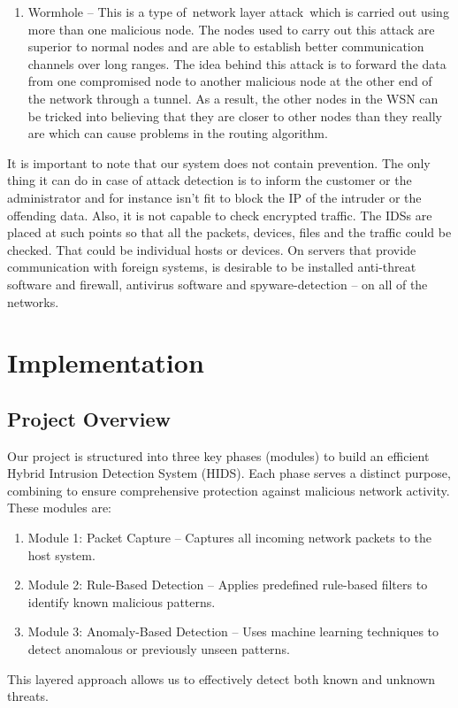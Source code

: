 \documentclass[oneside, english]{reports/assets/sdqtechreport}
\begin{document}
\begin{enumerate}
\begin{enumerate}
	\end{enumerate}
    \item Wormhole – This is a type of network layer attack which is carried out using more than one malicious node. The nodes used to carry out this attack are superior to normal nodes and are able to establish better communication channels over long ranges. The idea behind this attack is to forward the data from one compromised node to another malicious node at the other end of the network through a tunnel. As a result, the other nodes in the WSN can be tricked into believing that they are closer to other nodes than they really are which can cause problems in the routing algorithm.
\end{enumerate}
It is important to note that our system does not contain prevention. The only thing it can do in case of attack detection is to inform the customer or the administrator and for instance isn’t fit to block the IP of the intruder or the offending data. Also, it is not capable to check encrypted traffic.
The IDSs are placed at such points so that all the packets, devices, files and the traffic could be checked. That could be individual hosts or devices. On servers that provide communication with foreign systems, is desirable to be installed anti-threat software and firewall, antivirus software and spyware-detection – on all of the networks.

\chapter{Implementation}
\label{chap:Implementation}

\section{Project Overview}
\label{sec:ProjectOverview}
Our project is structured into three key phases (modules) to build an efficient Hybrid Intrusion Detection System (HIDS). Each phase serves a distinct purpose, combining to ensure comprehensive protection against malicious network activity. These modules are:
\begin{enumerate}
	\item Module 1: Packet Capture – Captures all incoming network packets to the host system.
	\item Module 2: Rule-Based Detection – Applies predefined rule-based filters to identify known malicious patterns.
	\item Module 3: Anomaly-Based Detection – Uses machine learning techniques to detect anomalous or previously unseen patterns.
\end{enumerate}
This layered approach allows us to effectively detect both known and unknown threats. 
\end{document}
